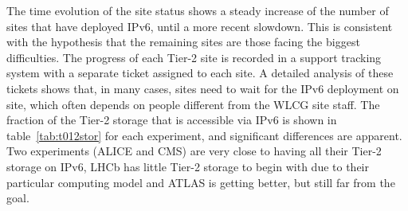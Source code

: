 The time evolution of the site status shows a steady increase of the
number of sites that have deployed IPv6, until a more recent
slowdown. This is consistent with the hypothesis that the remaining
sites are those facing the biggest difficulties. 
The progress of each Tier-2 site is recorded  in a support tracking system with
 a separate ticket assigned to each site.
A detailed analysis
of these tickets shows that, in many cases, sites need to wait for the
IPv6 deployment on site, which often depends on people different from
the WLCG site staff. The fraction of the Tier-2 storage that is
accessible via IPv6 is shown in table~\ref{tab:t012stor} for each 
experiment, and significant differences are apparent.
Two experiments (ALICE and CMS) are very close to having all their
Tier-2 storage on IPv6, LHCb has little Tier-2 storage to begin with
due to their particular computing model and ATLAS is getting better,
but still far from the goal.

